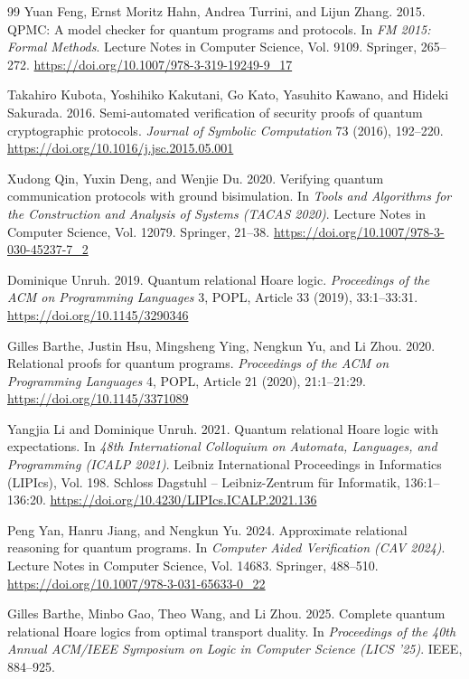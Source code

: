 \documentclass[conference,compsoc]{IEEEtran}
\begin{document}
\begin{thebibliography}{99}
Yuan Feng, Ernst Moritz Hahn, Andrea Turrini, and Lijun Zhang.
2015.
QPMC: A model checker for quantum programs and protocols.
In \emph{FM 2015: Formal Methods}. Lecture Notes in Computer Science, Vol. 9109. Springer, 265--272.
\url{https://doi.org/10.1007/978-3-319-19249-9_17}

Takahiro Kubota, Yoshihiko Kakutani, Go Kato, Yasuhito Kawano, and Hideki Sakurada.
2016.
Semi-automated verification of security proofs of quantum cryptographic protocols.
\emph{Journal of Symbolic Computation} 73 (2016), 192--220.
\url{https://doi.org/10.1016/j.jsc.2015.05.001}

Xudong Qin, Yuxin Deng, and Wenjie Du.
2020.
Verifying quantum communication protocols with ground bisimulation.
In \emph{Tools and Algorithms for the Construction and Analysis of Systems (TACAS 2020)}. Lecture Notes in Computer Science, Vol. 12079. Springer, 21--38.
\url{https://doi.org/10.1007/978-3-030-45237-7_2}

Dominique Unruh.
2019.
Quantum relational Hoare logic.
\emph{Proceedings of the ACM on Programming Languages} 3, POPL, Article 33 (2019), 33:1--33:31.
\url{https://doi.org/10.1145/3290346}

Gilles Barthe, Justin Hsu, Mingsheng Ying, Nengkun Yu, and Li Zhou.
2020.
Relational proofs for quantum programs.
\emph{Proceedings of the ACM on Programming Languages} 4, POPL, Article 21 (2020), 21:1--21:29.
\url{https://doi.org/10.1145/3371089}

Yangjia Li and Dominique Unruh.
2021.
Quantum relational Hoare logic with expectations.
In \emph{48th International Colloquium on Automata, Languages, and Programming (ICALP 2021)}. Leibniz International Proceedings in Informatics (LIPIcs), Vol. 198. Schloss Dagstuhl -- Leibniz-Zentrum f\"ur Informatik, 136:1--136:20.
\url{https://doi.org/10.4230/LIPIcs.ICALP.2021.136}

Peng Yan, Hanru Jiang, and Nengkun Yu.
2024.
Approximate relational reasoning for quantum programs.
In \emph{Computer Aided Verification (CAV 2024)}. Lecture Notes in Computer Science, Vol. 14683. Springer, 488--510.
\url{https://doi.org/10.1007/978-3-031-65633-0_22}

Gilles Barthe, Minbo Gao, Theo Wang, and Li Zhou.
2025.
Complete quantum relational Hoare logics from optimal transport duality.
In \emph{Proceedings of the 40th Annual ACM/IEEE Symposium on Logic in Computer Science (LICS '25)}. IEEE, 884--925.


\end{thebibliography}
\end{document}
